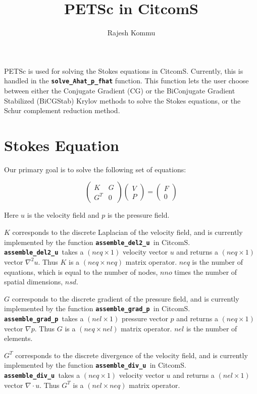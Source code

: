 \documentclass[10pt,letterpaper]{article}
\author{Rajesh Kommu}
\title{PETSc in CitcomS}
\newcommand{\code}[1]{\textbf{\texttt{#1}}}
\newcommand{\K}{\code{assemble\_del2\_u~}}
\newcommand{\G}{\code{assemble\_grad\_p~}}
\newcommand{\D}{\code{assemble\_div\_u~}}
\begin{document}
\maketitle
PETSc is used for solving the
Stokes equations in CitcomS. Currently, this is handled in the \code{solve\_Ahat\_p\_fhat} function. This 
function lets the user choose between either the Conjugate Gradient (CG) or the BiConjugate Gradient
Stabilized (BiCGStab) Krylov methods to solve the Stokes equations, or the Schur complement reduction 
method.

\section{Stokes Equation}
Our primary goal is to solve the following set of equations:

\begin{equation}\label{eqn-stokes-block}
\begin{pmatrix}
K & G \\ 
G^T & 0
\end{pmatrix} 
\begin{pmatrix}
V \\ 
P
\end{pmatrix}
=
\begin{pmatrix}
F \\ 
0
\end{pmatrix}
\end{equation}

Here $u$ is the velocity field and $p$ is the pressure field.

$K$ corresponds to the discrete Laplacian of the velocity field, and is 
currently implemented by the function \K in CitcomS. \K takes a $(neq\times1)$ 
velocity vector $u$ and returns a $(neq\times1)$ vector $\nabla^2u$. Thus
$K$ is a $(neq\times neq)$ matrix operator. $neq$ is the number of equations,
which is equal to the number of nodes, $nno$ times the number of spatial
dimensions, $nsd$.

$G$ corresponds to the discrete gradient of the pressure field, and is 
currently implemented by the function \G in CitcomS. \G takes a $(nel\times1)$ 
pressure vector $p$ and returns a $(neq\times1)$ vector $\nabla p$. Thus
$G$ is a $(neq\times nel)$ matrix operator. $nel$ is the number of elements.

$G^T$ corresponds to the discrete divergence of the velocity field, and is 
currently implemented by the function \D in CitcomS. \D takes a $(neq\times1)$ 
velocity vector $u$ and returns a $(nel\times1)$ vector $\nabla\cdot u$. Thus
$G^T$ is a $(nel\times neq)$ matrix operator.
\end{document}
